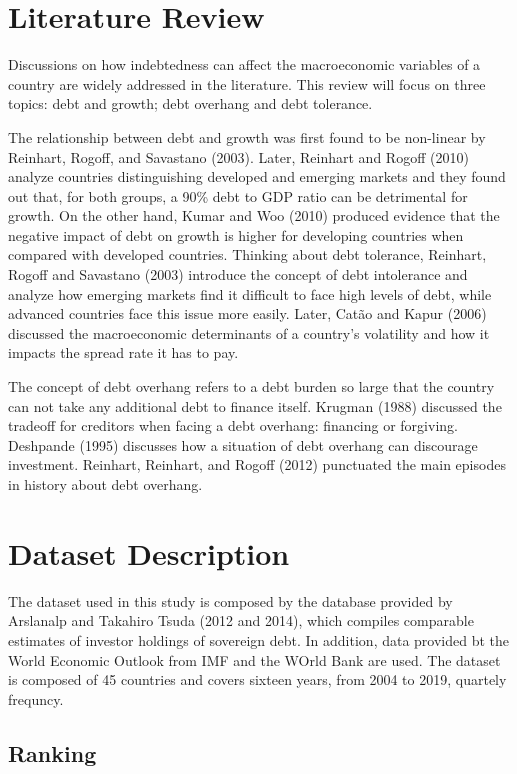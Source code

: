 \documentclass[]{article}
\begin{document}
\section{Literature Review}\label{literature-review}

Discussions on how indebtedness can affect the macroeconomic variables
of a country are widely addressed in the literature. This review will
focus on three topics: debt and growth; debt overhang and debt
tolerance.

The relationship between debt and growth was first found to be
non-linear by Reinhart, Rogoff, and Savastano (2003). Later, Reinhart
and Rogoff (2010) analyze countries distinguishing developed and
emerging markets and they found out that, for both groups, a 90\% debt
to GDP ratio can be detrimental for growth. On the other hand, Kumar and
Woo (2010) produced evidence that the negative impact of debt on growth
is higher for developing countries when compared with developed
countries. Thinking about debt tolerance, Reinhart, Rogoff and Savastano
(2003) introduce the concept of debt intolerance and analyze how
emerging markets find it difficult to face high levels of debt, while
advanced countries face this issue more easily. Later, Catão and Kapur
(2006) discussed the macroeconomic determinants of a country's
volatility and how it impacts the spread rate it has to pay.

The concept of debt overhang refers to a debt burden so large that the
country can not take any additional debt to finance itself. Krugman
(1988) discussed the tradeoff for creditors when facing a debt overhang:
financing or forgiving. Deshpande (1995) discusses how a situation of
debt overhang can discourage investment. Reinhart, Reinhart, and Rogoff
(2012) punctuated the main episodes in history about debt overhang.

\section{Dataset Description}\label{dataset-description}

The dataset used in this study is composed by the database provided by
Arslanalp and Takahiro Tsuda (2012 and 2014), which compiles comparable
estimates of investor holdings of sovereign debt. In addition, data
provided bt the World Economic Outlook from IMF and the WOrld Bank are
used. The dataset is composed of 45 countries and covers sixteen years,
from 2004 to 2019, quartely frequncy.

\subsection{Ranking}\label{ranking}
\end{document}
